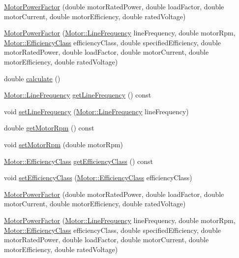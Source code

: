 \begin{DoxyCompactItemize}
\item 
\hyperlink{class_motor_power_factor_a1a2509240f0f759952debf47b7ef3a14}{Motor\+Power\+Factor} (double motor\+Rated\+Power, double load\+Factor, double motor\+Current, double motor\+Efficiency, double rated\+Voltage)
\item 
\hyperlink{class_motor_power_factor_ab48906ae429e7c6f05cebaed14fe2ca1}{Motor\+Power\+Factor} (\hyperlink{class_motor_acee1bdf1b684ad36cb80dc2829d9fcee}{Motor\+::\+Line\+Frequency} line\+Frequency, double motor\+Rpm, \hyperlink{class_motor_afa022971ae062406a9f588c601673d4e}{Motor\+::\+Efficiency\+Class} efficiency\+Class, double specified\+Efficiency, double motor\+Rated\+Power, double load\+Factor, double motor\+Current, double motor\+Efficiency, double rated\+Voltage)
\item 
double \hyperlink{class_motor_power_factor_ac9d5742db4a371bc4e15d5b29d335b6e}{calculate} ()
\item 
\hyperlink{class_motor_acee1bdf1b684ad36cb80dc2829d9fcee}{Motor\+::\+Line\+Frequency} \hyperlink{class_motor_power_factor_aa4cdc420b1f611bcb9f4a69c69c1fabf}{get\+Line\+Frequency} () const
\item 
void \hyperlink{class_motor_power_factor_a5186ccae4191cfc5b2b7c3bdbd166563}{set\+Line\+Frequency} (\hyperlink{class_motor_acee1bdf1b684ad36cb80dc2829d9fcee}{Motor\+::\+Line\+Frequency} line\+Frequency)
\item 
double \hyperlink{class_motor_power_factor_acc7e144fc6c05446141cb0e07be03d70}{get\+Motor\+Rpm} () const
\item 
void \hyperlink{class_motor_power_factor_a4154bf52c6c9c9e5fb2f0985d7ae3531}{set\+Motor\+Rpm} (double motor\+Rpm)
\item 
\hyperlink{class_motor_afa022971ae062406a9f588c601673d4e}{Motor\+::\+Efficiency\+Class} \hyperlink{class_motor_power_factor_a1ce98cb6ae9fbf09b05b4b6bd75e5c71}{get\+Efficiency\+Class} () const
\item 
void \hyperlink{class_motor_power_factor_add3125243d7f11131abc4e1d172ffdfc}{set\+Efficiency\+Class} (\hyperlink{class_motor_afa022971ae062406a9f588c601673d4e}{Motor\+::\+Efficiency\+Class} efficiency\+Class)
\item 
\hyperlink{class_motor_power_factor_a1a2509240f0f759952debf47b7ef3a14}{Motor\+Power\+Factor} (double motor\+Rated\+Power, double load\+Factor, double motor\+Current, double motor\+Efficiency, double rated\+Voltage)
\item 
\hyperlink{class_motor_power_factor_ab48906ae429e7c6f05cebaed14fe2ca1}{Motor\+Power\+Factor} (\hyperlink{class_motor_acee1bdf1b684ad36cb80dc2829d9fcee}{Motor\+::\+Line\+Frequency} line\+Frequency, double motor\+Rpm, \hyperlink{class_motor_afa022971ae062406a9f588c601673d4e}{Motor\+::\+Efficiency\+Class} efficiency\+Class, double specified\+Efficiency, double motor\+Rated\+Power, double load\+Factor, double motor\+Current, double motor\+Efficiency, double rated\+Voltage)

\end{DoxyCompactItemize}
